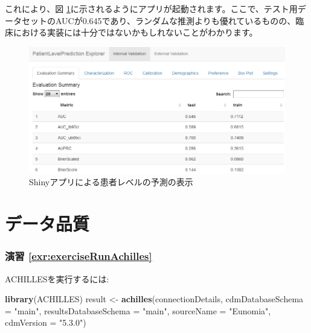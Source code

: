 \documentclass[
  11pt]{book}
\newenvironment{Shaded}{\begin{snugshade}}{\end{snugshade}}
\newcommand{\AttributeTok}[1]{\textcolor[rgb]{0.13,0.29,0.53}{#1}}
\newcommand{\FunctionTok}[1]{\textcolor[rgb]{0.13,0.29,0.53}{\textbf{#1}}}
\newcommand{\NormalTok}[1]{#1}
\newcommand{\OtherTok}[1]{\textcolor[rgb]{0.56,0.35,0.01}{#1}}
\newcommand{\StringTok}[1]{\textcolor[rgb]{0.31,0.60,0.02}{#1}}
\theoremstyle{definition}
\theoremstyle{definition}
\theoremstyle{definition}
\theoremstyle{definition}
\theoremstyle{remark}
\begin{document}
これにより、図 \ref{fig:plpShiny}に示されるようにアプリが起動されます。ここで、テスト用データセットのAUCが0.645であり、ランダムな推測よりも優れているものの、臨床における実装には十分ではないかもしれないことがわかります。

\begin{figure}

{\centering \includegraphics[width=1\linewidth]{images/SuggestedAnswers/plpShiny} 

}

\caption{Shinyアプリによる患者レベルの予測の表示}\label{fig:plpShiny}
\end{figure}

\section{データ品質}\label{DataQualityanswers}

\subsubsection*{演習 \ref{exr:exerciseRunAchilles}}\label{ux6f14ux7fd2-refexrexerciserunachilles}

ACHILLESを実行するには:

\begin{Shaded}
\begin{Highlighting}[]
\FunctionTok{library}\NormalTok{(ACHILLES)}
\NormalTok{result }\OtherTok{\textless{}{-}} \FunctionTok{achilles}\NormalTok{(connectionDetails,}
                   \AttributeTok{cdmDatabaseSchema =} \StringTok{"main"}\NormalTok{,}
                   \AttributeTok{resultsDatabaseSchema =} \StringTok{"main"}\NormalTok{,}
                   \AttributeTok{sourceName =} \StringTok{"Eunomia"}\NormalTok{,}
                   \AttributeTok{cdmVersion =} \StringTok{"5.3.0"}\NormalTok{)}
\end{Highlighting}
\end{Shaded}
\end{document}
